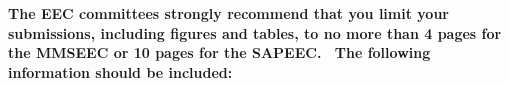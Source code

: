 \documentclass[12pt]{article}
\let\Otemize =\itemize
\def\Nospacing{\itemsep=0pt\topsep=0pt\partopsep=0pt\parskip=0pt\parsep=0pt}
\newenvironment{Itemize}{\Otemize\Nospacing}{\endlist}
\begin{document}
\footnotesize\sffamily

\noindent
\textbf{The EEC committees strongly recommend that you limit your
submissions, including figures and tables, to no more than 4 pages for the
MMSEEC or 10 pages for the SAPEEC. \ The following information should be
included:}\\

\scriptsize\sffamily


\footnotesize\sffamily

\normalsize\rmfamily

\end{document}
